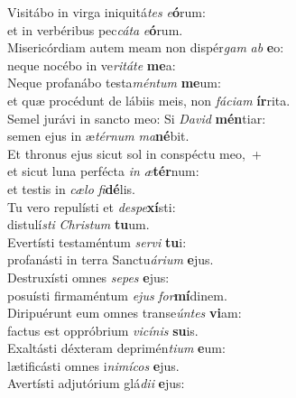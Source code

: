 \evenverse Visitábo in virga iniquitá\textit{tes} \textit{e}\textbf{ó}rum:~\*\\
\evenverse et in verbéribus pec\textit{cá}\textit{ta} \textit{e}\textbf{ó}rum.\\
\oddverse Misericórdiam autem meam non dispér\textit{gam} \textit{ab} \textbf{e}o:~\*\\
\oddverse neque nocébo in ve\textit{ri}\textit{tá}\textit{te} \textbf{me}a:\\
\evenverse Neque profanábo testa\textit{mén}\textit{tum} \textbf{me}um:~\*\\
\evenverse et quæ procédunt de lábiis meis, non \textit{fá}\textit{ci}\textit{am} \textbf{ír}rita.\\
\oddverse Semel jurávi in sancto meo: Si \textit{Da}\textit{vid} \textbf{mén}tiar:~\*\\
\oddverse semen ejus in æ\textit{tér}\textit{num} \textit{ma}\textbf{né}bit.\\
\evenverse Et thronus ejus sicut sol in conspéctu meo,~+\\
\evenverse  et sicut luna perfécta \textit{in} \textit{æ}\textbf{tér}num:~\*\\
\evenverse et testis in \textit{cæ}\textit{lo} \textit{fi}\textbf{dé}lis.\\
\oddverse Tu vero repulísti et \textit{de}\textit{spe}\textbf{xí}sti:~\*\\
\oddverse distulí\textit{sti} \textit{Chri}\textit{stum} \textbf{tu}um.\\
\evenverse Evertísti testaméntum \textit{ser}\textit{vi} \textbf{tu}i:~\*\\
\evenverse profanásti in terra Sanctu\textit{á}\textit{ri}\textit{um} \textbf{e}jus.\\
\oddverse Destruxísti omnes \textit{se}\textit{pes} \textbf{e}jus:~\*\\
\oddverse posuísti firmaméntum \textit{e}\textit{jus} \textit{for}\textbf{mí}dinem.\\
\evenverse Diripuérunt eum omnes transe\textit{ún}\textit{tes} \textbf{vi}am:~\*\\
\evenverse factus est oppróbrium \textit{vi}\textit{cí}\textit{nis} \textbf{su}is.\\
\oddverse Exaltásti déxteram deprimén\textit{ti}\textit{um} \textbf{e}um:~\*\\
\oddverse lætificásti omnes i\textit{ni}\textit{mí}\textit{cos} \textbf{e}jus.\\
\evenverse Avertísti adjutórium glá\textit{di}\textit{i} \textbf{e}jus:~\*\\
